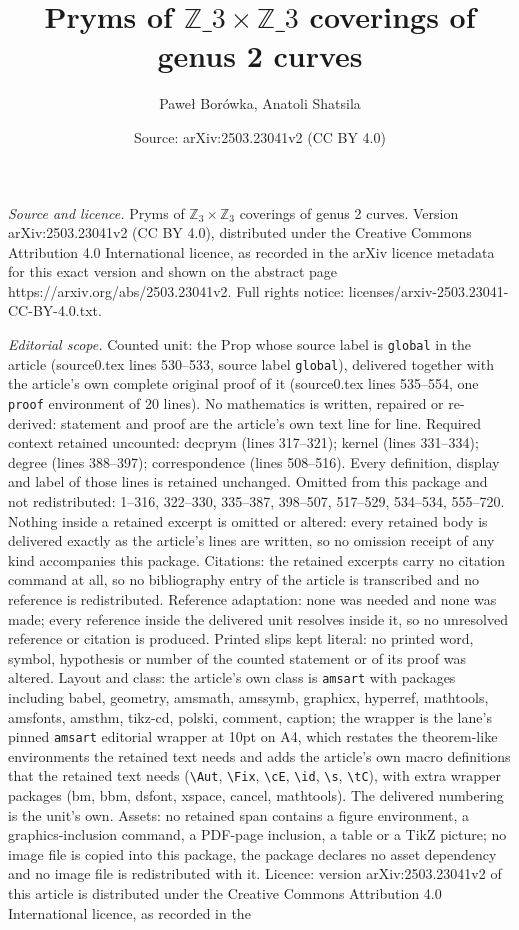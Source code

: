 \documentclass[10pt,a4paper]{amsart}
\title[Pryms of $\mathbb{Z}\_3\times\mathbb{Z}\_3$ coverings of genus]{Pryms of $\mathbb{Z}\_3\times\mathbb{Z}\_3$ coverings of genus 2 curves}
\author{Pawe{\l} Bor\'owka, Anatoli Shatsila}
\date{Source: arXiv:2503.23041v2 (CC BY 4.0)}
\begin{document}
\maketitle

\noindent\emph{Source and licence.} Pryms of $\mathbb{Z}_3\times\mathbb{Z}_3$ coverings of genus 2 curves. Version arXiv:2503.23041v2 (CC BY 4.0), distributed under the Creative Commons Attribution 4.0 International licence, as recorded in the arXiv licence metadata for this exact version and shown on the abstract page https://arxiv.org/abs/2503.23041v2. Full rights notice: licenses/arxiv-2503.23041-CC-BY-4.0.txt.\par\smallskip

\noindent\textit{Editorial scope.} Counted unit: the Prop whose source label is \texttt{global} in the article (source0.tex lines 530--533, source label \texttt{global}), delivered together with the article's own complete original proof of it (source0.tex lines 535--554, one \texttt{proof} environment of 20 lines). No mathematics is written, repaired or re-derived: statement and proof are the article's own text line for line. Required context retained uncounted: decprym (lines 317--321); kernel (lines 331--334); degree (lines 388--397); correspondence (lines 508--516). Every definition, display and label of those lines is retained unchanged. Omitted from this package and not redistributed: 1--316, 322--330, 335--387, 398--507, 517--529, 534--534, 555--720. Nothing inside a retained excerpt is omitted or altered: every retained body is delivered exactly as the article's lines are written, so no omission receipt of any kind accompanies this package. Citations: the retained excerpts carry no citation command at all, so no bibliography entry of the article is transcribed and no reference is redistributed. Reference adaptation: none was needed and none was made; every reference inside the delivered unit resolves inside it, so no unresolved reference or citation is produced. Printed slips kept literal: no printed word, symbol, hypothesis or number of the counted statement or of its proof was altered. Layout and class: the article's own class is \texttt{amsart} with packages including babel, geometry, amsmath, amssymb, graphicx, hyperref, mathtools, amsfonts, amsthm, tikz-cd, polski, comment, caption; the wrapper is the lane's pinned \texttt{amsart} editorial wrapper at 10pt on A4, which restates the theorem-like environments the retained text needs and adds the article's own macro definitions that the retained text needs (\texttt{\textbackslash Aut}, \texttt{\textbackslash Fix}, \texttt{\textbackslash cE}, \texttt{\textbackslash id}, \texttt{\textbackslash s}, \texttt{\textbackslash tC}), with extra wrapper packages (bm, bbm, dsfont, xspace, cancel, mathtools). The delivered numbering is the unit's own. Assets: no retained span contains a figure environment, a graphics-inclusion command, a PDF-page inclusion, a table or a TikZ picture; no image file is copied into this package, the package declares no asset dependency and no image file is redistributed with it. Licence: version arXiv:2503.23041v2 of this article is distributed under the Creative Commons Attribution 4.0 International licence, as recorded in the 
\end{document}

